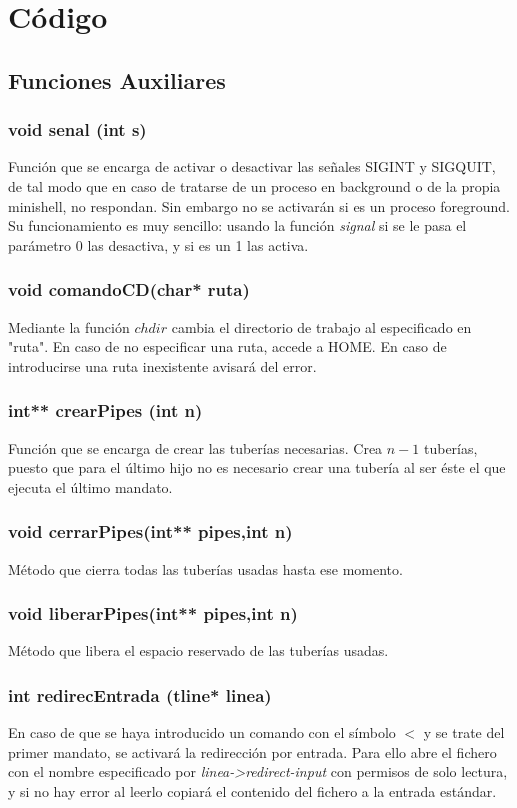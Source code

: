 \chapter{Código}
\section{Funciones Auxiliares}
\subsection{void senal (int s)}
Función que se encarga de activar o desactivar las señales SIGINT y SIGQUIT, de tal modo que en caso de tratarse de un proceso en background o de la propia minishell, no respondan. Sin embargo no se activarán si es un proceso foreground.\\
Su funcionamiento es muy sencillo: usando la función \textit{signal} si se le pasa el parámetro 0 las desactiva, y si es un 1 las activa.
\subsection{void comandoCD(char* ruta)}
Mediante la función $chdir$ cambia el directorio de trabajo al especificado en "ruta". En caso de no especificar una ruta, accede a HOME. En caso de introducirse una ruta inexistente avisará del error.
\subsection{int** crearPipes (int n)}
Función que se encarga de crear las tuberías necesarias. Crea $n-1$ tuberías, puesto que para el último hijo no es necesario crear una tubería al ser éste el que ejecuta el último mandato.
\subsection{void cerrarPipes(int** pipes,int n)}
Método que cierra todas las tuberías usadas hasta ese momento.
\subsection{void liberarPipes(int** pipes,int n)}
Método que libera el espacio reservado de las tuberías usadas.
\subsection{int redirecEntrada (tline* linea)}
En caso de que se haya introducido un comando con el símbolo $<$ y se trate del primer mandato, se activará la redirección por entrada. Para ello abre el fichero con el nombre especificado por \textit{linea->redirect-input} con permisos de solo lectura, y si no hay error al leerlo copiará el contenido del fichero a la entrada estándar.
